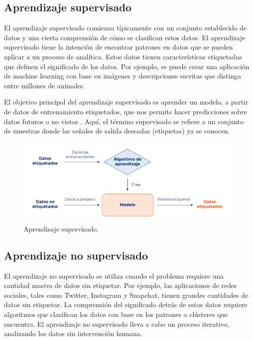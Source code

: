 \subsection{Aprendizaje supervisado}

El aprendizaje supervisado comienza típicamente con un conjunto establecido de datos y una cierta comprensión de cómo se clasifican estos datos. El aprendizaje supervisado tiene la intención de encontrar patrones en datos que se pueden aplicar a un proceso de analítica. Estos datos tienen características etiquetadas que definen el significado de los datos. Por ejemplo, se puede crear una aplicación de machine learning con base en imágenes y descripciones escritas que distinga entre millones de animales\cite{ibm}.

\vspace{1\baselineskip}
El objetivo principal del aprendizaje supervisado es aprender un modelo, a partir de datos de entrenamiento etiquetados, que nos permite hacer predicciones sobre datos futuros o no vistos \cite{mirjalili2020python}. Aquí, el término supervisado se refiere a un conjunto de muestras donde las señales
de salida deseadas (etiquetas) ya se conocen.

\begin{figure}[H]
  \begin{center}
    \includegraphics[scale=0.60]{./aprendisaje_supervisado.png}
    \caption{Aprendisaje supervisado\cite{decide}.}
    \label{fig:aprendisajesupervisado}
  \end{center}
\end{figure}

\subsection{Aprendizaje no supervisado}

El aprendizaje no supervisado se utiliza cuando el problema requiere una cantidad masiva de datos sin etiquetar. Por ejemplo, las aplicaciones de redes sociales, tales como Twitter, Instagram y Snapchat, tienen grandes cantidades de datos sin etiquetar. La comprensión del significado detrás de estos datos requiere algoritmos que clasifican los datos con base en los patrones o clústeres que encuentra. El aprendizaje no supervisado lleva a cabo un proceso iterativo, analizando los datos sin intervención humana\cite{ibm}.

